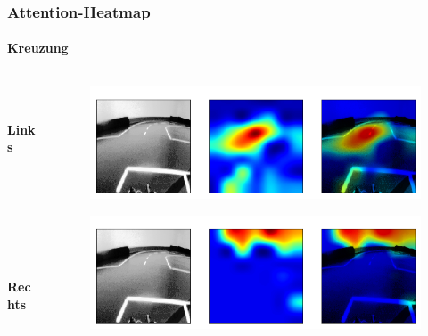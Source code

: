 \documentclass{beamer}
\begin{document}
\begin{frame}
\frametitle{Attention-Heatmap}
\framesubtitle{Kreuzung}

\begin{columns}[T]

\begin{column}[T]{2cm}
\quad \\
\quad \\
\textbf{Links} \\
\quad \\
\quad \\
\quad \\
\quad \\
\quad \\
\quad \\
\quad \\
\textbf{Rechts}	
\end{column}

\begin{column}[T]{8cm}
	\begin{figure}
	\centering
	\includegraphics[width=\linewidth]{figures/kreuzungleft.png}	 
	\label{img:kreuzungleft}
	\end{figure}

	\begin{figure}
	\centering
	\includegraphics[width=\linewidth]{figures/kreuzungright.png}	 
	\label{img:kreuzungright}
	\end{figure}
\end{column}

\end{columns}

\end{frame}
\end{document}
